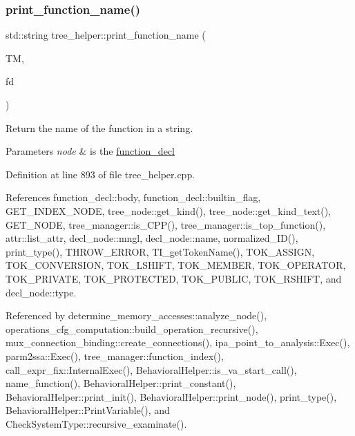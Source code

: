 \subsubsection{\texorpdfstring{print\+\_\+function\+\_\+name()}{print\_function\_name()}}
{\footnotesize\ttfamily std\+::string tree\+\_\+helper\+::print\+\_\+function\+\_\+name (\begin{DoxyParamCaption}\item[{const \hyperlink{tree__manager_8hpp_a792e3f1f892d7d997a8d8a4a12e39346}{tree\+\_\+manager\+Const\+Ref}}]{TM,  }\item[{const \hyperlink{structfunction__decl}{function\+\_\+decl} $\ast$}]{fd }\end{DoxyParamCaption})\hspace{0.3cm}{\ttfamily [static]}}



Return the name of the function in a string. 


\begin{DoxyParams}{Parameters}
{\em node} & is the \hyperlink{structfunction__decl}{function\+\_\+decl} \\
\hline
\end{DoxyParams}


Definition at line 893 of file tree\+\_\+helper.\+cpp.



References function\+\_\+decl\+::body, function\+\_\+decl\+::builtin\+\_\+flag, G\+E\+T\+\_\+\+I\+N\+D\+E\+X\+\_\+\+N\+O\+DE, tree\+\_\+node\+::get\+\_\+kind(), tree\+\_\+node\+::get\+\_\+kind\+\_\+text(), G\+E\+T\+\_\+\+N\+O\+DE, tree\+\_\+manager\+::is\+\_\+\+C\+P\+P(), tree\+\_\+manager\+::is\+\_\+top\+\_\+function(), attr\+::list\+\_\+attr, decl\+\_\+node\+::mngl, decl\+\_\+node\+::name, normalized\+\_\+\+I\+D(), print\+\_\+type(), T\+H\+R\+O\+W\+\_\+\+E\+R\+R\+OR, T\+I\+\_\+get\+Token\+Name(), T\+O\+K\+\_\+\+A\+S\+S\+I\+GN, T\+O\+K\+\_\+\+C\+O\+N\+V\+E\+R\+S\+I\+ON, T\+O\+K\+\_\+\+L\+S\+H\+I\+FT, T\+O\+K\+\_\+\+M\+E\+M\+B\+ER, T\+O\+K\+\_\+\+O\+P\+E\+R\+A\+T\+OR, T\+O\+K\+\_\+\+P\+R\+I\+V\+A\+TE, T\+O\+K\+\_\+\+P\+R\+O\+T\+E\+C\+T\+ED, T\+O\+K\+\_\+\+P\+U\+B\+L\+IC, T\+O\+K\+\_\+\+R\+S\+H\+I\+FT, and decl\+\_\+node\+::type.



Referenced by determine\+\_\+memory\+\_\+accesses\+::analyze\+\_\+node(), operations\+\_\+cfg\+\_\+computation\+::build\+\_\+operation\+\_\+recursive(), mux\+\_\+connection\+\_\+binding\+::create\+\_\+connections(), ipa\+\_\+point\+\_\+to\+\_\+analysis\+::\+Exec(), parm2ssa\+::\+Exec(), tree\+\_\+manager\+::function\+\_\+index(), call\+\_\+expr\+\_\+fix\+::\+Internal\+Exec(), Behavioral\+Helper\+::is\+\_\+va\+\_\+start\+\_\+call(), name\+\_\+function(), Behavioral\+Helper\+::print\+\_\+constant(), Behavioral\+Helper\+::print\+\_\+init(), Behavioral\+Helper\+::print\+\_\+node(), print\+\_\+type(), Behavioral\+Helper\+::\+Print\+Variable(), and Check\+System\+Type\+::recursive\+\_\+examinate().


